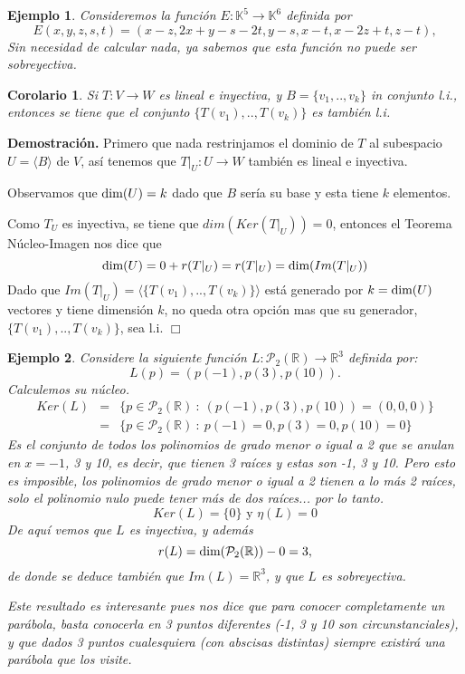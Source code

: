 \documentclass[12pt]{book}
\newtheorem{cor}{Corolario}
\newtheorem{ejem}{Ejemplo}
\def\R{\mathbb{R}}
\def\K{\mathbb{K}}
\def\P{\mathcal{P}}
\def\dim{\textup{dim}}
\begin{document}
\begin{ejem} Consideremos la función $E:\K^5\rightarrow\K^6$ definida por 
$$E(x,y,z,s,t)=(x-z, 2x+y-s-2t, y-s, x-t, x-2z+t, z-t),$$
  Sin necesidad de calcular nada, ya sabemos que esta función no puede ser sobreyectiva.
\end{ejem}


\begin{cor}
Si $T:V\rightarrow W$ es lineal e inyectiva, y $B=\{v_1,..,v_k\}$ in conjunto l.i., entonces se tiene que el conjunto $\{T(v_1),..,T(v_k)\}$ es también l.i.
\end{cor}
{\bf Demostración.}
Primero que nada restrinjamos el dominio de $T$ al subespacio $U=\langle B\rangle$ de $V$, así tenemos que $T|_{U}:U\rightarrow W$ también es lineal e inyectiva.

Observamos que $\dim(U)=k$ dado que $B$ sería su base y esta tiene $k$ elementos.

Como $T_U$ es inyectiva, se tiene que $dim (Ker(T|_U))=0$, entonces el Teorema Núcleo-Imagen nos dice que
$$\dim(U)=0+r(T|_U)=r(T|_U)=\dim(Im(T|_U))$$
Dado que $Im(T|_U)=\langle\{T(v_1),..,T(v_k)\}\rangle$ está generado por $k=\dim(U)$ vectores y tiene dimensión $k$, no queda otra opción mas que su generador, $\{T(v_1),..,T(v_k)\}$, sea l.i.
\hfill $\Box$

\begin{ejem}
  Considere la siguiente función $L:\P_2(\R)\rightarrow \R^3$ definida por:
  $$L(p)=(p(-1),p(3),p(10)).$$
  Calculemos su núcleo.
  \begin{eqnarray*}
    Ker(L)&=&\{p\in\P_2(\R)\ :\ (p(-1),p(3),p(10))=(0,0,0)\}\\
    &=&\{p\in\P_2(\R)\ :\ p(-1)=0, p(3)=0, p(10)=0\}
  \end{eqnarray*}
  Es el conjunto de todos los polinomios de grado menor o igual a 2 que se anulan en $x=-1$, 3 y 10, es decir, que tienen 3 raíces y estas son -1, 3 y 10.
  Pero esto es imposible, los polinomios de grado menor o igual a 2 tienen a lo más 2 raíces, solo el polinomio nulo puede tener más de dos raíces... por lo tanto.
  $$Ker(L)=\{0\}\textrm{ y } \eta(L)=0$$
  De aquí vemos que $L$ es inyectiva, y además
  $$r(L)=\dim(\P_2(\R))-0=3,$$
  de donde se deduce también que $Im(L)=\R^3$, y que $L$ es sobreyectiva.

  Este resultado es interesante pues nos dice que para conocer completamente un parábola, basta conocerla en 3 puntos diferentes (-1, 3 y 10 son circunstanciales), y que dados 3 puntos cualesquiera (con abscisas distintas) siempre existirá una parábola que los visite.
\end{ejem}
\end{document}

